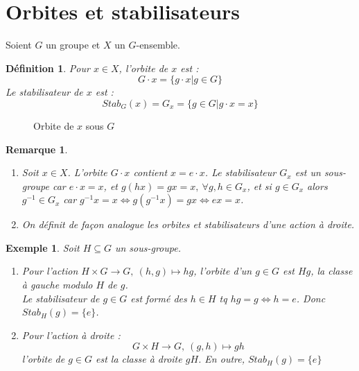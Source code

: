 \documentclass[a4paper, oneside]{report}
\theoremstyle{break}
\newtheorem{defi}[thm]{Définition}
\newtheorem{exem}[thm]{Exemple}
\newtheorem{remar}[thm]{Remarque}
\newcommand{\x}{\times}
\begin{document}
\section{Orbites et stabilisateurs}
Soient $G$ un groupe et $X$ un $G$-ensemble.

\begin{defi}
	Pour $x\in X$, l'orbite de $x$ est :
	$$G \cdot x=\{g \cdot x | g\in G \}$$
	Le stabilisateur de $x$ est :
	$$Stab_G(x)=G_x=\{g\in G | g \cdot x=x \}$$
\end{defi}

\begin{figure} [h]
	\begin{center}
		\caption{Orbite de $x$ sous $G$}
	\end{center}	
\end{figure}

\begin{remar}
	\begin{enumerate}
		\item Soit $x\in X$. L'orbite $G \cdot x$ contient $x=e \cdot x$. Le stabilisateur $G_x$ est un sous-groupe car $e \cdot x=x$, et $g(hx)= gx=x,~\forall g,h\in G_x$, et si $g\in G_x$ alors $g^{-1}\in G_x$ car $g^{-1}x = x \Leftrightarrow g(g^{-1}x)=gx \Leftrightarrow ex = x$.
		\item On définit de façon analogue les orbites et stabilisateurs d'une action à droite.
	\end{enumerate}
\end{remar}

\begin{exem}
	Soit $H\subseteq G$ un sous-groupe.
	\begin{enumerate}
		\item Pour l'action $H\x G \rightarrow G,~(h,g)\mapsto hg$, l'orbite d'un $g\in G$ est $Hg$, la classe à gauche modulo $H$ de $g$.\\
		Le stabilisateur de $g\in G$ est formé des $h\in H$ tq $hg=g \Leftrightarrow h=e$. Donc $Stab_H(g)=\{e\}$.\\
		\item Pour l'action à droite :
		$$G\x H \rightarrow G,~(g,h)\mapsto gh$$
		l'orbite de $g\in G$ est la classe à droite $gH$. En outre, $Stab_H(g)=\{e\}$
	\end{enumerate}
\end{exem}
\end{document}
